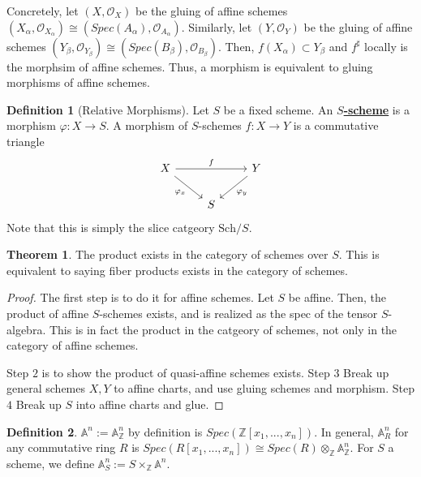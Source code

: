 \documentclass{article}
\theoremstyle{definition}
\newtheorem{theorem}{Theorem}[section]
\theoremstyle{definition}
\newtheorem{definition}{Definition}[theorem]
\theoremstyle{definition}
\theoremstyle{definition}
\theoremstyle{definition}
\theoremstyle{definition}
\theoremstyle{definition}
\begin{document}
Concretely, let $(X,\mathcal{O}_X)$ be the gluing of affine schemes $(X_{\alpha}, \mathcal{O}_{X_{\alpha}})\cong (Spec(A_{\alpha}), \mathcal{O}_{A_{\alpha}})$. Similarly, let $(Y,\mathcal{O}_Y)$ be the gluing of affine schemes $(Y_{\beta}, \mathcal{O}_{Y_{\beta}})\cong (Spec(B_{\beta}), \mathcal{O}_{B_{\beta}})$. Then, $f(X_{\alpha})\subset Y_{\beta}$ and $f^{\sharp}$ locally is the morphsim of affine schemes. Thus, a morphism is equivalent to gluing morphisms of affine schemes. 



\begin{tcolorbox}[colback=purple!5!white,colframe=purple!75!black]
\begin{definition}[Relative Morphisms]
Let $S$ be a fixed scheme. An \underline{\textbf{$S$-scheme}} is a morphism $\varphi: X\to S$. A morphism of $S$-schemes $f: X\to Y$ is a commutative triangle 
\[\begin{tikzcd}
	X && Y \\
	& S
	\arrow["f", from=1-1, to=1-3]
	\arrow["{\varphi_x}"', from=1-1, to=2-2]
	\arrow["{\varphi_y}", from=1-3, to=2-2]
\end{tikzcd}\]
Note that this is simply the slice catgeory $\textrm{Sch}/S$. 
\end{definition}
\end{tcolorbox}


\begin{tcolorbox}[colback=red!5!white,colframe=red!30!white]
\begin{theorem}
The product exists in the category of schemes over $S$. This is equivalent to saying fiber products exists in the category of schemes. 
\end{theorem}
\end{tcolorbox}
\begin{proof}
    The first step is to do it for affine schemes. Let $S$ be affine. Then, the product of affine $S$-schemes exists, and is realized as the spec of the tensor $S$-algebra. This is in fact the product in the catgeory of schemes, not only in the category of affine schemes. 

    Step $2$ is to show the product of quasi-affine schemes exists. 
    Step $3$ Break up general schemes $X,Y$ to affine charts, and use gluing schemes and morphism. 
    Step $4$ Break up $S$ into affine charts and glue. 
\end{proof}


\begin{tcolorbox}[colback=purple!5!white,colframe=purple!75!black]
\begin{definition}
$\mathbb{A}^n:=\mathbb{A}^n_{\mathbb{Z}}$ by definition is $Spec(\mathbb{Z}[x_1,...,x_n])$. In general, $\mathbb{A}^n_R$ for any commutative ring $R$ is $Spec(R[x_1,...,x_n])\cong Spec(R)\otimes_{\mathbb{Z}}\mathbb{A}^n_{\mathbb{Z}}$. For $S$ a scheme, we define $\mathbb{A}^n_S:= S\times_{\mathbb{Z}}\mathbb{A}^n$. 
\end{definition}
\end{tcolorbox}
\end{document}
